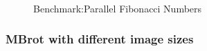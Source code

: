\begin{figure}[p]
\begin{center}
{        }\\
    \end{center}
    \caption{Benchmark:Parallel Fibonacci Numbers}
   \label{fib_efficiency}
\end{figure}

\subsubsection{MBrot with different image sizes}

\begin{figure}[p]
     \begin{center}
\end{center}
\end{figure}
